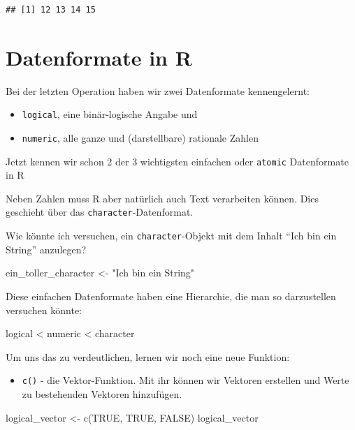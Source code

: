 \documentclass[
]{book}
\newenvironment{Shaded}{\begin{snugshade}}{\end{snugshade}}
\newcommand{\ConstantTok}[1]{\textcolor[rgb]{0.00,0.00,0.00}{#1}}
\newcommand{\FunctionTok}[1]{\textcolor[rgb]{0.00,0.00,0.00}{#1}}
\newcommand{\NormalTok}[1]{#1}
\newcommand{\OtherTok}[1]{\textcolor[rgb]{0.56,0.35,0.01}{#1}}
\newcommand{\StringTok}[1]{\textcolor[rgb]{0.31,0.60,0.02}{#1}}
\providecommand{\tightlist}{%
  \setlength{\itemsep}{0pt}\setlength{\parskip}{0pt}}
\begin{document}
\begin{verbatim}
## [1] 12 13 14 15
\end{verbatim}

\hypertarget{datenformate-in-r}{%
\section{Datenformate in R}\label{datenformate-in-r}}

Bei der letzten Operation haben wir zwei Datenformate kennengelernt:

\begin{itemize}
\item
  \texttt{logical}, eine binär-logische Angabe und
\item
  \texttt{numeric}, alle ganze und (darstellbare) rationale Zahlen
\end{itemize}

Jetzt kennen wir schon 2 der 3 wichtigsten einfachen oder \texttt{atomic} Datenformate in R

Neben Zahlen muss R aber natürlich auch Text verarbeiten können. Dies geschieht über das \texttt{character}-Datenformat.

Wie könnte ich versuchen, ein \texttt{character}-Objekt mit dem Inhalt ``Ich bin ein String'' anzulegen?

\begin{Shaded}
\begin{Highlighting}[]
\NormalTok{ein\_toller\_character }\OtherTok{\textless{}{-}} \StringTok{"Ich bin ein String"}
\end{Highlighting}
\end{Shaded}

Diese einfachen Datenformate haben eine Hierarchie, die man so darzustellen versuchen könnte:

logical \textless{} numeric \textless{} character

Um uns das zu verdeutlichen, lernen wir noch eine neue Funktion:

\begin{itemize}
\tightlist
\item
  \texttt{c()} - die Vektor-Funktion. Mit ihr können wir Vektoren erstellen und Werte zu bestehenden Vektoren hinzufügen.
\end{itemize}

\begin{Shaded}
\begin{Highlighting}[]
\NormalTok{logical\_vector }\OtherTok{\textless{}{-}} \FunctionTok{c}\NormalTok{(}\ConstantTok{TRUE}\NormalTok{, }\ConstantTok{TRUE}\NormalTok{, }\ConstantTok{FALSE}\NormalTok{)}
\NormalTok{logical\_vector}
\end{Highlighting}
\end{Shaded}
\end{document}
